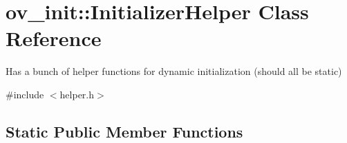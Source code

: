 \hypertarget{classov__init_1_1InitializerHelper}{}\section{ov\+\_\+init\+:\+:Initializer\+Helper Class Reference}
\label{classov__init_1_1InitializerHelper}


Has a bunch of helper functions for dynamic initialization (should all be static)  




{\ttfamily \#include $<$helper.\+h$>$}

\subsection*{Static Public Member Functions}
